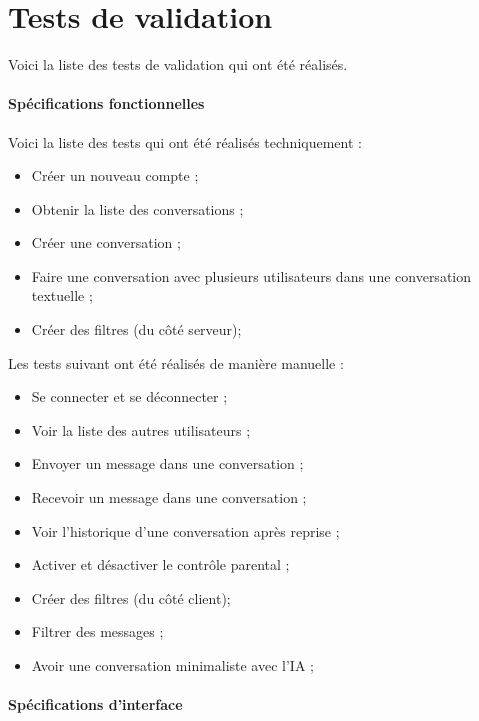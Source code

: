  


\section{Tests de validation}

Voici la liste des tests de validation qui ont été réalisés. \\


\paragraph{Spécifications fonctionnelles\\} 

Voici la liste des tests qui ont été réalisés techniquement :
\begin{itemize}
	\item Créer un nouveau compte ;
	\item Obtenir la liste des conversations ;
	\item Créer une conversation ;
	\item Faire une conversation avec plusieurs utilisateurs dans une conversation textuelle ; 
	\item Créer des filtres (du côté serveur);
\end{itemize}

Les tests suivant ont été réalisés de manière manuelle : 
\begin{itemize}
	\item Se connecter et se déconnecter ;
	\item Voir la liste des autres utilisateurs ;
	\item Envoyer un message dans une conversation ;
	\item Recevoir un message dans une conversation ;
	\item Voir l'historique d'une conversation après reprise ;
	\item Activer et désactiver le contrôle parental ;
	\item Créer des filtres (du côté client);
	\item Filtrer des messages ; 
	\item Avoir une conversation minimaliste avec l'IA ; \\
\end{itemize}

\paragraph{Spécifications d'interface \\}

